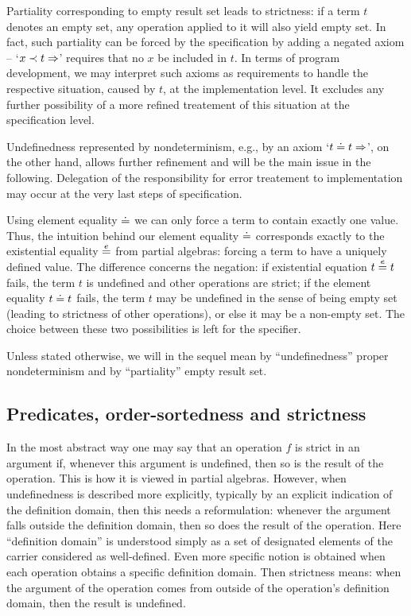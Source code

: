 \documentclass[10pt]{article}
\begin{document}

Partiality corresponding to empty result set leads to strictness: if a term
$t$ denotes an empty set, any operation applied to it will also yield empty set.
In fact, such partiality
can be forced by the specification by adding a negated axiom -- `$x\prec
t\Rightarrow$' requires that no $x$ be included in $t$. In terms of program development,
we may interpret such axioms as requirements to handle the respective 
situation, caused by $t$, at the implementation level. It
excludes any further possibility of a more refined treatement of
this situation at the specification level. 

Undefinedness represented by nondeterminism, e.g., by an axiom `$t\mathrel{\dot{=} }
t\Rightarrow$', on the other hand, allows
further refinement and will be the main issue in the following. 
 Delegation of
the responsibility for error treatement to implementation may occur at the
very last steps of specification.

Using element equality $\mathrel{\dot{=} }$ we can 
only force a term to contain exactly one value. Thus, the intuition behind our element equality
$\mathrel{\dot{=} }$ corresponds exactly to the existential equality $\stackrel{e}{=}$ from partial
algebras: forcing a term to have a uniquely defined value.
The difference concerns the negation: if existential equation $t\stackrel{e}{=} t$
fails, the term $t$ is undefined and other operations are strict; if the
element equality $t\mathrel{\dot{=} } t$ fails, the term $t$ may be undefined in the sense
of being empty set (leading to strictness of other operations), or else it
may be a non-empty set. The choice between these two possibilities is left
for the specifier.

Unless stated otherwise, we will in the sequel mean by ``undefinedness'' proper
nondeterminism and by ``partiality'' empty result set.

\subsection{Predicates, order-sortedness and strictness}
In the most abstract way one may say that an operation $f$ is strict in an
argument if, whenever this argument is undefined, then so is the result of
the operation. This is how it is viewed in partial algebras. However, when
undefinedness is described more explicitly, typically by an explicit
indication of the definition domain, then this needs a
reformulation: whenever the  argument falls outside  the definition
domain, then so does the result of the operation. Here ``definition domain''
is understood simply as a set of designated elements of the carrier
considered as well-defined. Even more specific notion is obtained when 
each operation obtains a specific definition domain. Then strictness means:
when the argument of the operation comes from outside of the operation's definition
domain, then the result is undefined.
\end{document}
